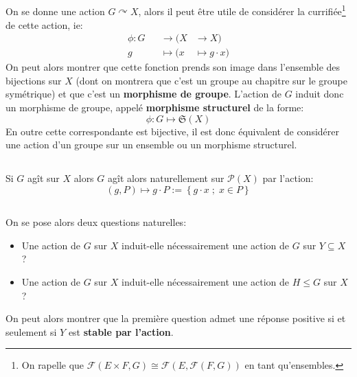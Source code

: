 \subsection*{}
On se donne une action \( G \curvearrowright X\), alors il peut être utile de considérer la currifiée\footnote[1]{On rapelle que \( \mathcal{F}(E \times F, G) \cong \mathcal{F}(E, \mathcal{F}(F, G)) \) en tant qu'ensembles.} de cette action, ie:
\[ 
   \begin{aligned}
      \phi : G &&\longrightarrow (X &\longrightarrow X)\\
      g &&\longmapsto (x &\longmapsto g \cdot x)
   \end{aligned}
\]
On peut alors montrer que cette fonction prends son image dans l'ensemble des bijections sur \( X \) (dont on montrera que c'est un groupe au chapitre sur le groupe symétrique) et que c'est un \textbf{morphisme de groupe}. L'action de \( G \) induit donc un morphisme de groupe, appelé \textbf{morphisme structurel} de la forme:
\[ 
   \phi : G \longmapsto \mathfrak{S}(X)
\]
En outre cette correspondante est bijective, il est donc équivalent de considérer une action d'un groupe sur un ensemble ou un morphisme structurel.
\subsection*{}
Si \(G\) agît sur \( X \) alors \( G\) agît alors naturellement sur \( \mathcal{P}(X)  \) par l'action:
\[ 
   (g, P) \mapsto g \cdot P := \left\{ g \cdot x \; ; \; x \in P \right\} 
\]
\subsection*{}
On se pose alors deux questions naturelles:
\begin{itemize}
   \item Une action de \( G \) sur \( X \) induit-elle nécessairement une action de \( G \) sur \( Y \subseteq X \) ?
   \item Une action de \( G \) sur \( X \) induit-elle nécessairement une action de \( H \leq G \) sur \(X\) ?
\end{itemize}
On peut alors montrer que la première question admet une réponse positive si et seulement si \( Y \) est \textbf{stable par l'action}.\<

